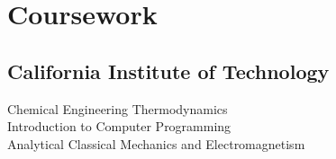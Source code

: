 \documentclass[letterpaper]{deedy-resume} %
\begin{document}
\begin{minipage}[t]{0.39\textwidth}
\section{Coursework}

\subsection{California Institute of \newline Technology}
Chemical Engineering Thermodynamics\\
Introduction to Computer Programming\\
Analytical Classical Mechanics and Electromagnetism\\

\sectionspace 










\end{minipage}
\end{document}
